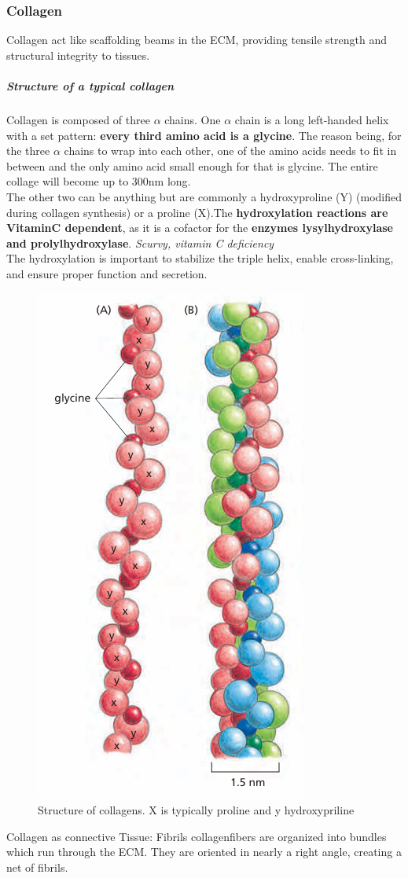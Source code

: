 \documentclass[../main.tex]{subfiles}
\begin{document}
\subsubsection{Collagen}
Collagen act like scaffolding beams in the ECM, providing tensile strength and structural integrity to tissues.
\subparagraph{Structure of a typical collagen}
Collagen is composed of three $\alpha$ chains. One $\alpha$ chain is a long left-handed helix with a set pattern: \textbf{every third amino acid is a \gls{glycine}}. The reason being, for the three $\alpha$ chains to wrap into each other, one of the amino acids needs to fit in between and the only amino acid small enough for that is glycine. The entire collage will become up to 300nm long.\\
\indent The other two can be anything but are commonly a \gls{hydroxyproline} (Y) (modified during collagen synthesis) or a \gls{proline} (X).The \textbf{hydroxylation reactions are \textbf{\gls{VitaminC}} dependent}, as it is a cofactor for the \textbf{enzymes \gls{lysylhydroxylase} and \gls{prolylhydroxylase}}. \textit{Scurvy, vitamin C deficiency}\\
The hydroxylation is important to stabilize the triple helix, enable cross-linking, and ensure proper function and secretion.

\begin{figure}[H]
	\centering
	\includegraphics[width=0.3\linewidth]{coll_struc}
	\caption{Structure of collagens. X is typically proline and y hydroxypriline}
	\label{fig:collstruc}
\end{figure}

\begin{RemarkWithTitel}{Collagen as connective Tissue: Fibrils}
	\gls{collagenfibers} are organized into bundles which run through the ECM. They are oriented in nearly a right angle, creating a net of fibrils. 
\end{RemarkWithTitel}
\end{document}
